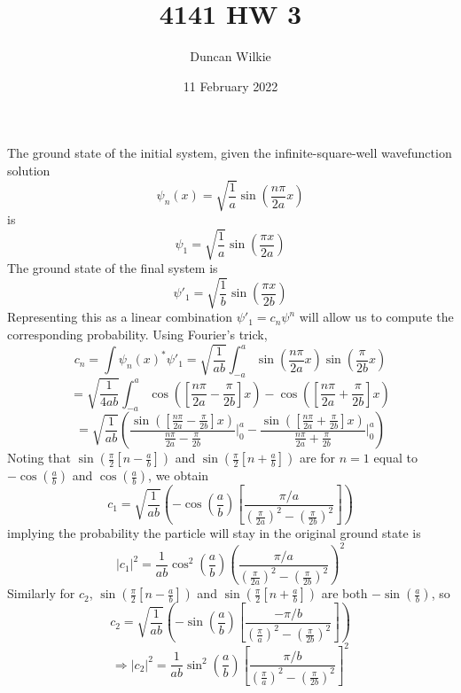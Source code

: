 \documentclass{article}
\title{4141 HW 3}
\author{Duncan Wilkie}
\date{11 February 2022}
\begin{document}
\maketitle

\section{}
The ground state of the initial system, given the infinite-square-well wavefunction solution
\[\psi_{n}(x)=\sqrt{\frac{1}{a}}\sin\left(\frac{n\pi}{2a}x \right)\]
is
\[\psi_{1}=\sqrt{\frac{1}{a}}\sin\left( \frac{\pi x}{2a} \right)\]
The ground state of the final system is
\[\psi'_{1}=\sqrt{\frac{1}{b}}\sin\left( \frac{\pi x}{2b} \right)\]
Representing this as a linear combination $\psi'_{1}=c_{n}\psi^{n}$ will allow us to compute the corresponding probability. Using Fourier's trick,
\[c_{n}=\int\psi_{n}(x)^{*}\psi'_{1}=\sqrt{\frac{1}{ab}}\int_{-a}^{a} \sin\left( \frac{n\pi}{2a}x \right)\sin\left( \frac{\pi}{2b}x \right)\]
\[=\sqrt{\frac{1}{4ab}}\int_{-a}^{a}\cos\left( \left[ \frac{n\pi}{2a}-\frac{\pi}{2b}\right]x\right) -\cos\left( \left[ \frac{n\pi}{2a}+\frac{\pi}{2b}\right] x\right)\]
\[=\sqrt{\frac{1}{ab}}\left( \frac{\sin\left( \left[ \frac{n\pi}{2a}-\frac{\pi}{2b}\right]x \right)}{\frac{n\pi}{2a}-\frac{\pi}{2b}}\bigg|_{0}^{a}-\frac{\sin\left( \left[ \frac{n\pi}{2a}+\frac{\pi}{2b} \right]x \right)}{\frac{n\pi}{2a}+\frac{\pi}{2b}}\bigg|_{0}^{a} \right)\]
Noting that $\sin\left( \frac{\pi}{2}\left[ n-\frac{a}{b} \right] \right)$ and $\sin\left( \frac{\pi}{2}\left[ n+\frac{a}{b} \right] \right)$ are for $n=1$ equal to $-\cos\left( \frac{a}{b} \right)$ and $\cos\left( \frac{a}{b} \right)$, we obtain
\[c_{1}=\sqrt{\frac{1}{ab}}\left( -\cos\left( \frac{a}{b} \right) \left[ \frac{\pi/a}{\left( \frac{\pi}{2a} \right)^{2}-\left( \frac{\pi}{2b} \right)^{2}} \right]\right)\]
implying the probability the particle will stay in the original ground state is
\[|c_{1}|^{2}=\frac{1}{ab}\cos^{2}\left( \frac{a}{b} \right)\left( \frac{\pi/a}{\left( \frac{\pi}{2a} \right)^{2}-\left( \frac{\pi}{2b} \right)^{2}} \right)^{2}\]
Similarly for $c_{2}$,  $\sin\left( \frac{\pi}{2}\left[ n-\frac{a}{b} \right] \right)$ and $\sin\left( \frac{\pi}{2}\left[ n+\frac{a}{b} \right] \right)$ are both  $-\sin\left( \frac{a}{b} \right)$, so
\[c_{2}=\sqrt{\frac{1}{ab}}\left( -\sin\left( \frac{a}{b} \right) \left[ \frac{-\pi/b}{\left( \frac{\pi}{a} \right)^{2}-\left( \frac{\pi}{2b} \right)^{2}} \right]\right)\]
\[\Rightarrow |c_{2}|^{2}=\frac{1}{ab}\sin^{2}\left( \frac{a}{b} \right)\left[ \frac{\pi/b}{\left( \frac{\pi}{a} \right)^{2}-\left( \frac{\pi}{2b} \right)^{2}} \right]^{2}\]
\end{document}
